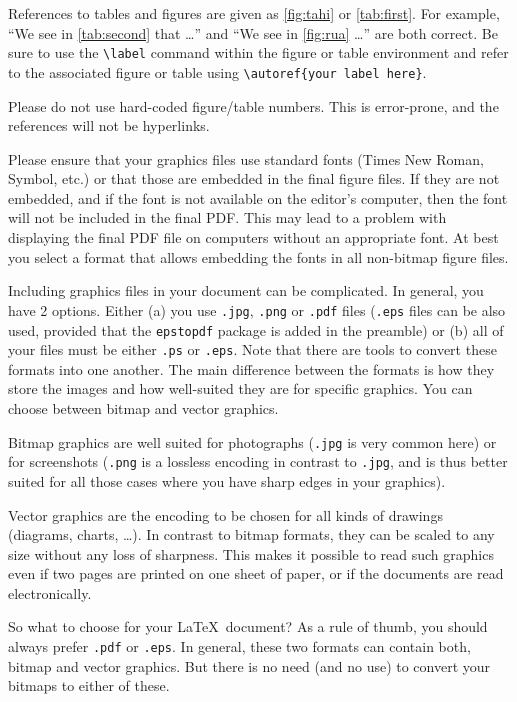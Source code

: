 \documentclass{scspaperproc}
\theoremstyle{scsthe}
\begin{document}
References to tables and figures are given as \autoref{fig:tahi} or \autoref{tab:first}. For example, ``We see in \autoref{tab:second} that \ldots'' and ``We see in \autoref{fig:rua} \ldots'' are both correct. Be sure to use the \verb+\label+ command within the figure or table environment and refer to the associated figure or table using \verb+\autoref{your label here}+.

Please do not use hard-coded figure/table numbers. This is error-prone, and the references will not be hyperlinks.

Please ensure that your graphics files use standard fonts (Times New Roman, Symbol, etc.) or that those are embedded in the final figure files.
If they are not embedded, and if the font is not available on the editor's computer, then the font will not be included in the final PDF.
This may lead to a problem with displaying the final PDF file on computers without an appropriate font.
At best you select a format that allows embedding the fonts in all non-bitmap figure files.

Including graphics files in your document can be complicated. In general, you have 2 options. Either (a) you use \texttt{.jpg}, \texttt{.png} or \texttt{.pdf} files (\texttt{.eps} files can be also used, provided that the \texttt{epstopdf} package is added in the preamble) or (b) all of your files must be either \texttt{.ps} or \texttt{.eps}.
Note that there are tools to convert these formats into one another. The main difference between the formats is how they store the images and how well-suited they are for specific graphics. You can choose between bitmap and vector graphics.

Bitmap graphics are well suited for photographs (\texttt{.jpg} is very common here) or for screenshots (\texttt{.png} is a lossless encoding in contrast to \texttt{.jpg}, and is thus better suited for all those cases where you have sharp edges in your graphics).

Vector graphics are the encoding to be chosen for all kinds of drawings (diagrams, charts, \ldots). In contrast to bitmap formats, they can be scaled to any size without any loss of sharpness. This makes it possible to read such graphics even if two pages are printed on one sheet of paper, or if the documents are read electronically.

So what to choose for your \LaTeX\ document? As a rule of thumb, you should always prefer \texttt{.pdf} or \texttt{.eps}.
In general, these two formats can contain both, bitmap and vector graphics. But there is no need (and no use) to convert your bitmaps to either of these.
\end{document}
